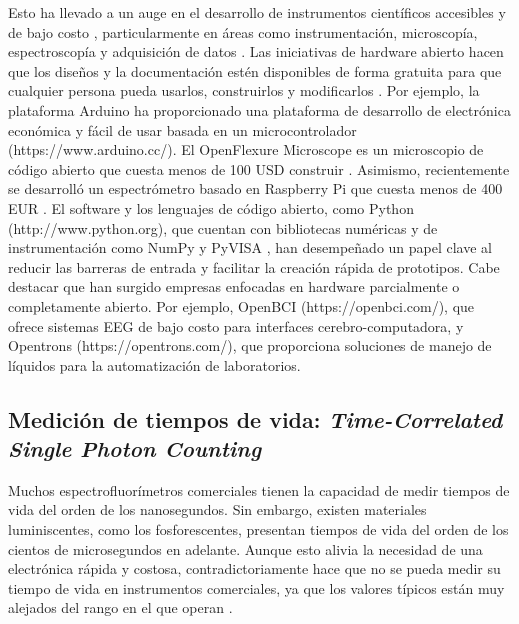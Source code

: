 Esto ha llevado a un auge en el desarrollo de instrumentos científicos accesibles y de bajo costo \cite{wenzel_open_2023, arancio_inequalities_2023}, particularmente en áreas como instrumentación, microscopía, espectroscopía y adquisición de datos \cite{jameson_fluorescent_1989, li_optical_2022, hu_fluorescent_2022}.
Las iniciativas de hardware abierto hacen que los diseños y la documentación estén disponibles de forma gratuita para que cualquier persona pueda usarlos, construirlos y modificarlos \cite{powell_democratizing_2012, oellermann_open_2022}.
Por ejemplo, la plataforma Arduino ha proporcionado una plataforma de desarrollo de electrónica económica y fácil de usar basada en un microcontrolador (https://www.arduino.cc/).
El OpenFlexure Microscope es un microscopio de código abierto que cuesta menos de 100 USD construir \cite{collins_robotic_2020}.
Asimismo, recientemente se desarrolló un espectrómetro basado en Raspberry Pi que cuesta menos de 400 EUR \cite{tunens_optical_2024}.
El software y los lenguajes de código abierto, como Python (http://www.python.org), que cuentan con bibliotecas numéricas y de instrumentación como NumPy \cite{harris_array_2020} y PyVISA \cite{grecco_pyvisa_2023}, han desempeñado un papel clave al reducir las barreras de entrada y facilitar la creación rápida de prototipos.
Cabe destacar que han surgido empresas enfocadas en hardware parcialmente o completamente abierto. Por ejemplo, OpenBCI (https://openbci.com/), que ofrece sistemas EEG de bajo costo para interfaces cerebro-computadora, y Opentrons (https://opentrons.com/), que proporciona soluciones de manejo de líquidos para la automatización de laboratorios.


\subsection{Medición de tiempos de vida: \textit{Time-Correlated Single Photon Counting}} \label{sec:intro_tcspc}

Muchos espectrofluorímetros comerciales tienen la capacidad de medir tiempos de vida del orden de los nanosegundos. 
Sin embargo, existen materiales luminiscentes, como los fosforescentes, presentan tiempos de vida del orden de los cientos de microsegundos en adelante.
Aunque esto alivia la necesidad de una electrónica rápida y costosa, contradictoriamente hace que no se pueda medir su tiempo de vida en instrumentos comerciales, ya que los valores típicos están muy alejados del rango en el que operan \cite{bujjamer2020}.

